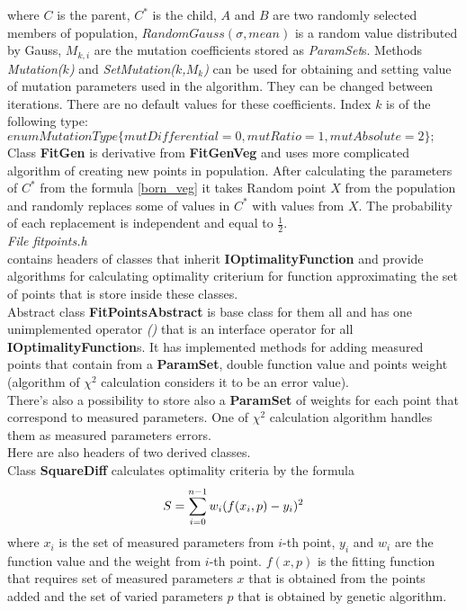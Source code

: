 \documentclass[a4paper]{article}
\begin{document}
where $C$ is the parent, $C^*$ is the child, $A$ and $B$ are two randomly selected members of population, $RandomGauss(\sigma, mean)$ is a random value distributed by Gauss, $M_{k,i}$ are the mutation coefficients stored as \textit{ParamSet}s.
Methods \textit{Mutation($k$)} and \textit{SetMutation($k$,$M_k$)} can be used for obtaining and setting value of mutation parameters used in the algorithm. They can be changed between iterations.
There are no default values for these coefficients.
Index $k$ is of the following type:\\
$enum MutationType\{mutDifferential=0,mutRatio=1,mutAbsolute=2\};$
\\
Class \textbf{FitGen} is derivative from \textbf{FitGenVeg} and uses more complicated algorithm of creating new points in population. After calculating the parameters of $C^*$ from the formula \ref{born_veg} it takes Random point $X$ from the population and randomly replaces some of values in $C^*$ with values from $X$. The probability of each replacement is independent and equal to $\frac{1}{2}$.
\\
\textit{\Large File fitpoints.h}\\
contains headers of classes that inherit \textbf{IOptimalityFunction} and provide algorithms for calculating optimality criterium for function approximating the set of points that is store inside these classes.
\\
Abstract class \textbf{FitPointsAbstract} is base class for them all and has one unimplemented operator \textit{()} that is an interface operator for all \textbf{IOptimalityFunction}s. It has implemented methods for adding measured points that contain from a \textbf{ParamSet}, double function value and points weight (algorithm of $\chi^2$ calculation considers it to be an error value).
\\
There's also a possibility to store also a \textbf{ParamSet} of weights for each point that correspond to measured parameters.
One of $\chi^2$ calculation algorithm handles them as measured parameters errors.
\\
Here are also headers of two derived classes.\\
Class \textbf{SquareDiff} calculates optimality criteria by the formula
\begin{equation}\Large
S = \sum_{i=0}^{n-1} w_i (f(x_i, p)-y_i)^2
\end{equation}
where $x_i$ is the set of measured parameters from $i$-th point, $y_i$ and $w_i$ are the function value and the weight from $i$-th point. $f(x,p)$ is the fitting function that requires set of measured parameters $x$ that is obtained from the points added and the set of varied parameters $p$ that is obtained by genetic algorithm.
\end{document}
